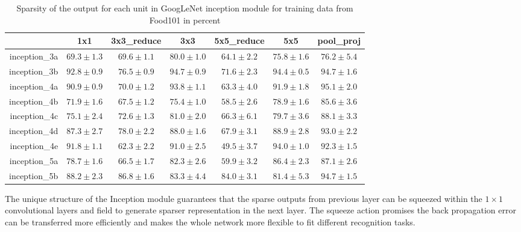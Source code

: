 \begin{table}[htbp]
  \centering
  \caption{Sparsity of the output for each unit in GoogLeNet inception module for training data from Food101 in percent}
    \begin{tabular}{r|cccccc}
    \toprule
          & 1x1  & 3x3\_reduce & 3x3  & 5x5\_reduce & 5x5  & pool\_proj  \\
    \midrule
    inception\_3a & $69.3\pm 1.3$  & $69.6 \pm 1.1$  & $80.0\pm  1.0$& $64.1\pm  2.2$& $75.8\pm  1.6$& $76.2\pm 5.4$\\
    inception\_3b & $92.8 \pm 0.9$&$ 76.5 \pm 0.9$& $94.7\pm 0.9 $&$ 71.6 \pm 2.3 $&$ 94.4\pm 0.5 $&$ 94.7 \pm 1.6$\\
    inception\_4a & $90.9 \pm 0.9$& $70.0\pm 1.2 $& $93.8\pm 1.1 $& $63.3\pm 4.0 $& $91.9\pm 1.8 $& $95.1\pm 2.0$\\
    inception\_4b & $71.9 \pm 1.6$& $67.5\pm 1.2$ & $75.4\pm  1.0$& $58.5 \pm 2.6$& $78.9\pm  1.6$& $85.6\pm 3.6$\\
    inception\_4c & $75.1 \pm 2.4$& $72.6 \pm 1.3$& $81.0\pm 2.0$ & $66.3\pm 6.1 $& $79.7 \pm 3.6$& $88.1\pm 3.3$\\
    inception\_4d & $87.3 \pm 2.7$& $78.0 \pm 2.2$& $88.0\pm 1.6$& $67.9\pm 3.1 $& $88.9\pm 2.8 $& $93.0\pm 2.2$\\
    inception\_4e & $91.8\pm  1.1$& $62.3\pm 2.2 $& $91.0\pm 2.5 $& $49.5 \pm 3.7$& $94.0 \pm 1.0$& $92.3\pm 1.5$\\
    inception\_5a & $78.7 \pm 1.6$& $66.5\pm  1.7$& $82.3\pm 2.6 $& $59.9\pm 3.2 $& $86.4\pm 2.3 $& $87.1\pm 2.6$\\
    inception\_5b & $88.2\pm 2.3 $& $86.8 \pm 1.6$&$ 83.3\pm 4.4$ & $84.0\pm 3.1 $& $81.4\pm 5.3$  & $94.7\pm 1.5$\\
    \bottomrule
    \end{tabular}%
  \label{tab:sparse}%
\end{table}%

The unique structure of the Inception module guarantees that the sparse outputs from previous layer can be squeezed within the $1\times 1$ convolutional layers and field to generate sparser representation in the next layer. The squeeze action promises the back propagation error can be transferred more efficiently and makes the whole network more flexible to fit different recognition tasks.

